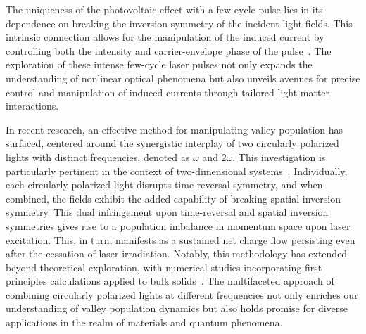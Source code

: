 The uniqueness of the photovoltaic effect with a few-cycle pulse lies in its dependence on breaking the inversion symmetry of the incident light fields. This intrinsic connection allows for the manipulation of the induced current by controlling both the intensity and carrier-envelope phase of the pulse~\cite{Schiffrin2013,Higuchi2017}. The exploration of these intense few-cycle laser pulses not only expands the understanding of nonlinear optical phenomena but also unveils avenues for precise control and manipulation of induced currents through tailored light-matter interactions.


In recent research, an effective method for manipulating valley population has surfaced, centered around the synergistic interplay of two circularly polarized lights with distinct frequencies, denoted as $\omega$ and $2\omega$. This investigation is particularly pertinent in the context of two-dimensional systems~\cite{Jimenez-Galan2020,Mrudul:21}. Individually, each circularly polarized light disrupts time-reversal symmetry, and when combined, the fields exhibit the added capability of breaking spatial inversion symmetry. This dual infringement upon time-reversal and spatial inversion symmetries gives rise to a population imbalance in momentum space upon laser excitation. This, in turn, manifests as a sustained net charge flow persisting even after the cessation of laser irradiation. Notably, this methodology has extended beyond theoretical exploration, with numerical studies incorporating first-principles calculations applied to bulk solids~\cite{PhysRevLett.127.126601}. The multifaceted approach of combining circularly polarized lights at different frequencies not only enriches our understanding of valley population dynamics but also holds promise for diverse applications in the realm of materials and quantum phenomena.
